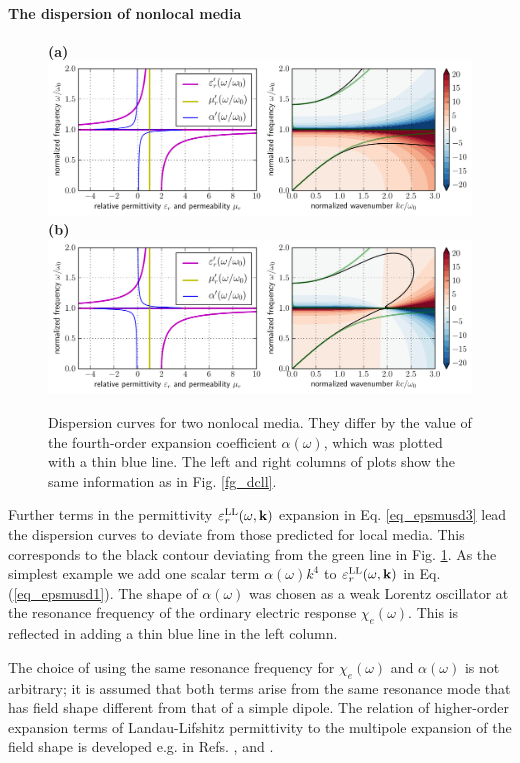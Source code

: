 \paragraph{The dispersion of nonlocal media} %
\begin{figure}[t] \caption{Dispersion curves for two nonlocal media. They differ by the value of the fourth-order expansion coefficient $\alpha(\omega)$, which was plotted with a thin blue line. The left and right columns of plots show the same information as in Fig. \ref{fg_dcll}.  } \label{fg_dcll_nl} \centering  
\textbf{(a)}\\	\includegraphics[width=1\textwidth]{img/dispersion_landau_lifshitz/dispersion_ll_quadrupp.pdf}
\textbf{(b)}\\	\includegraphics[width=1\textwidth]{img/dispersion_landau_lifshitz/dispersion_ll_quadrupn.pdf}
\end{figure}
Further terms in the permittivity $\varepsilon_r^\text{LL}(\omega,{\mathbf{k}})$ expansion in Eq. \ref{eq_epsmusd3} lead the dispersion curves to deviate from those predicted for local media. This corresponds to the black contour deviating from the green line in Fig. \ref{fg_dcll_nl}.
As the simplest example we add one scalar term $\alpha(\omega) k^4$ to $\varepsilon_r^\text{LL}(\omega,{\mathbf{k}})$ in Eq. (\ref{eq_epsmusd1}). The shape of $\alpha(\omega)$  was chosen as a weak Lorentz oscillator at the resonance frequency of the ordinary electric response $\chi_e(\omega)$. This is reflected in adding a thin blue line in the left column.

\label{chap_sd}
The choice of using the same resonance frequency for $\chi_e(\omega)$ and $\alpha(\omega)$ is not arbitrary; it is assumed that both terms arise from the same resonance mode that has field shape different from that of a simple dipole. The relation of higher-order expansion terms of Landau-Lifshitz permittivity  to the multipole expansion of the field shape is developed e.g. in Refs. \cite{agranovich2006spatial}, \cite{vinogradov2002form} and \cite{fietz2011homogenization}.

